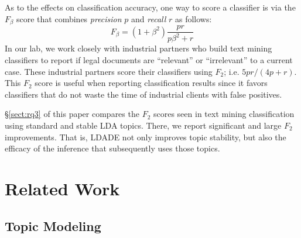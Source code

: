 \documentclass[twocolumn,5p,sort&compress]{elsarticle}
\newcommand{\tion}[1]{{\S}\ref{sect:#1}}
\theoremstyle{break}
\begin{document}
As to the effects on classification accuracy, 
one way to score a classifier is via the $F_\beta$ score that combines
{\em precision} $p$ and {\em recall} $r$ as follows:
\begin{equation}\label{eg:f}
F_{\beta} = (1+\beta^2) \frac{pr}{p\beta^2 + r}
\end{equation}
In our lab, we work closely with industrial partners who build
text mining
 classifiers to report if legal documents are
``relevant'' or ``irrelevant'' to a current case.
These industrial partners score their classifiers using   $F_2$; i.e.
\mbox{$5pr/(4p + r)$}. This $F_2$ score is useful when reporting classification results
since it favors classifiers that do not waste the time of industrial clients with false positives.

\tion{rq3} of this paper compares the $F_2$ scores seen in text mining classification using standard and stable LDA topics.
There, we report 
significant and large
$F_2$ improvements. That is, LDADE not only improves topic stability, but also the efficacy
of the inference that subsequently uses those topics.
\section{Related Work}
\label{sect:related}

\subsection{Topic Modeling}\label{sect:tm}
\end{document}
